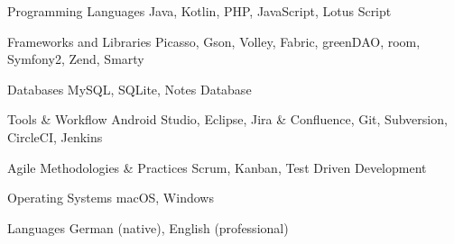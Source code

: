 

\begin{cvskills}

  \cvskill
    {Programming Languages} %
    {Java, Kotlin, PHP, JavaScript, Lotus Script} %
  
  \cvskill
    {Frameworks and Libraries} %
    {Picasso, Gson, Volley, Fabric, greenDAO, room, Symfony2, Zend, Smarty} %
  
  \cvskill
    {Databases} %
    {MySQL, SQLite, Notes Database} %

  \cvskill
    {Tools \& Workflow} %
    {Android Studio, Eclipse, Jira \& Confluence, Git, Subversion, CircleCI, Jenkins} %

  \cvskill
    {Agile Methodologies \& Practices} %
    {Scrum, Kanban, Test Driven Development} %

  \cvskill
    {Operating Systems} %
    {macOS, Windows} %

  \cvskill
    {Languages} %
    {German (native), English (professional)} %

\end{cvskills}
